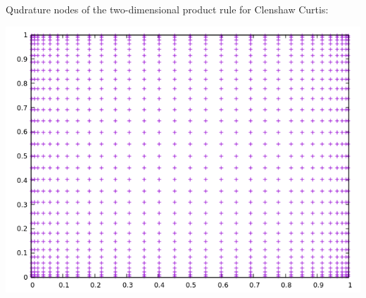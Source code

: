 \documentclass[10pt,a4paper]{article}
\begin{document}
Qudrature nodes of the two-dimensional product rule for Clenshaw Curtis:
\begin{center}
\includegraphics[scale=0.5]{quadrature_nodes_clenshaw_curtis.png}		
\end{center}
\end{document}
